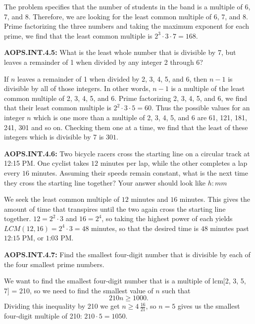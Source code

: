 \documentclass[11pt]{article}
\newenvironment{uzdevums}[1][\unskip]{%
\vspace{3mm}
\noindent
\textbf{#1:}
\noindent}
{}
\begin{document}
The problem specifies that the number of students in the band is a multiple of 6, 7, and 8. Therefore, we are looking for the least common multiple of 6, 7, and 8. Prime factorizing the three numbers and taking the maximum exponent for each prime, we find that the least common multiple is $2^3\cdot 3\cdot 7=\boxed{168}$.


\begin{uzdevums}[AOPS.INT.4.5]
What is the least whole number that is divisible by 7, but leaves a remainder of 1 when divided by any integer 2 through 6?
\end{uzdevums}

If $n$ leaves a remainder of 1 when divided by 2, 3, 4, 5, and 6, then $n-1$ is divisible by all of those integers. In other words, $n-1$ is a multiple of the least common multiple of 2, 3, 4, 5, and 6. Prime factorizing 2, 3, 4, 5, and 6, we find that their least common multiple is $2^2\cdot 3\cdot 5=60$. Thus the possible values for an integer $n$ which is one more than a multiple of 2, 3, 4, 5, and 6 are 61, 121, 181, 241, 301 and so on. Checking them one at a time, we find that the least of these integers which is divisible by 7 is $\boxed{301}$.


\begin{uzdevums}[AOPS.INT.4.6]
Two bicycle racers cross the starting line on a circular track at 12:15 PM. One cyclist takes $12$ minutes per lap, while the other completes a lap every $16$ minutes. Assuming their speeds remain constant, what is the next time they cross the starting line together? Your answer should look like $h:mm$
\end{uzdevums}

We seek the least common multiple of $12$ minutes and $16$ minutes. This gives the amount of time that transpires until the two again cross the starting line together. $12=2^2\cdot 3$ and $16=2^4$, so taking the highest power of each yields $LCM(12,16)=2^4\cdot 3=48$ minutes, so that the desired time is $48$ minutes past $\text{12:15 PM}$, or $\boxed{\text{1:03 PM}}$.


\begin{uzdevums}[AOPS.INT.4.7]
Find the smallest four-digit number that is divisible by each of the four smallest prime numbers.
\end{uzdevums}

We want to find the smallest four-digit number that is a multiple of lcm[2, 3, 5, 7] = 210, so we need to find the smallest value of $n$ such that $$ 210n \ge 1000. $$Dividing this inequality by 210 we get $n \ge 4\, \frac{16}{21}$, so $n = 5$ gives us the smallest four-digit multiple of 210: $210 \cdot 5 = \boxed{1050}$.
\end{document}
